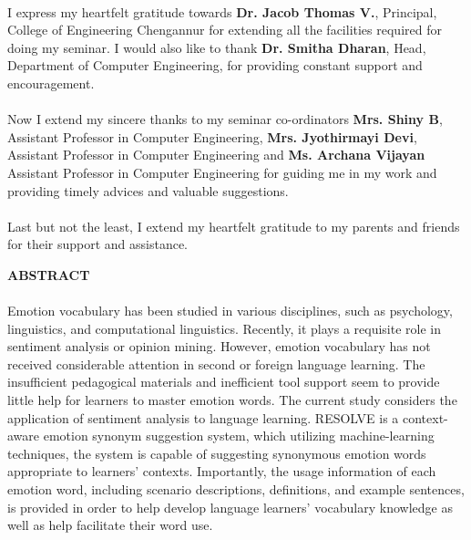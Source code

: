 \documentclass[a4paper,12pt,oneside]{article}
\begin{document}
\paragraph{}
I express my heartfelt gratitude towards \textbf{Dr. Jacob Thomas V.}, Principal, College
of Engineering Chengannur for extending all the facilities required for doing my seminar.
I would also like to thank \textbf{Dr. Smitha Dharan}, Head, Department of Computer
Engineering, for providing constant support and encouragement.
\paragraph{}
Now I extend my sincere thanks to my seminar co-ordinators \textbf{Mrs. Shiny B}, Assistant
Professor in Computer Engineering, \textbf{Mrs. Jyothirmayi Devi}, Assistant
Professor in Computer Engineering and \textbf{Ms. Archana Vijayan} Assistant Professor in Computer Engineering for guiding me in my work and providing timely
advices and valuable suggestions.
\paragraph{}
Last but not the least, I extend my heartfelt gratitude to my parents and friends for
their support and assistance.	

\newpage
\begin{center}
\large{\textbf{ABSTRACT}}
\end{center}
\vspace{4ex}
\paragraph{}
Emotion vocabulary has been studied in various disciplines, such as psychology, linguistics, and computational linguistics. Recently, it plays a requisite role in sentiment analysis or opinion mining. However, emotion vocabulary has not received considerable attention in second or foreign language learning. The insufficient pedagogical materials and inefficient tool support seem to provide little help for learners to master emotion words. The current study considers the application of sentiment analysis to language learning. RESOLVE is a context-aware emotion synonym suggestion system, which utilizing machine-learning techniques, the system is capable of suggesting synonymous emotion words appropriate to learners’ contexts. Importantly, the usage information of each emotion word, including scenario descriptions, definitions, and example sentences, is provided in order to help develop language learners’ vocabulary knowledge as well as help facilitate their word use. 
\end{document}
